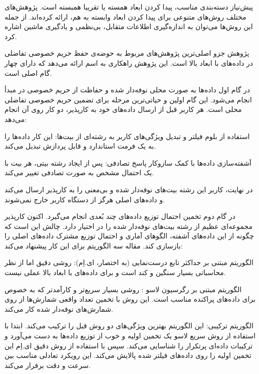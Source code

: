 پیش‌نیاز دسته‌بندی مناسب، پیدا کردن ابعاد همسته یا تقریبا همبسته است. پژوهش‌های مختلف روش‌های متنوعی برای پیدا کردن ابعاد وابسته به هم، ارائه کرده‌اند. از جمله این روش‌ها می‌توان به اندازه‌گیری اطلاعات متقابل، بی‌نظمی و یادگیری ماشین اشاره کرد.


پژوهش  جزو اصلی‌ترین پژوهش‌های مربوط به حوضه‌ی حفظ حریم خصوصی تفاضلی در داده‌های با ابعاد بالا است. این پژوهش راهکاری به اسم  ارائه می‌دهد که دارای چهار گام اصلی است.

در گام اول داده‌ها به صورت محلی نوفه‌دار شده و حفاظت از حریم خصوصی در مبدأ انجام می‌شود. این گام اولین و حیاتی‌ترین مرحله برای تضمین حریم خصوصی تفاضلی محلی است. هر کاربر قبل از ارسال داده‌های خود به کارپذیر، دو کار روی آن انجام می‌دهد:


 استفاده از بلوم فیلتر و تبدیل ویژگی‌های کاربر به رشته‌ای از بیت‌ها: این کار داده‌ها را به یک فرمت استاندارد و قابل پردازش تبدیل می‌کند.

 آشفته‌سازی داده‌ها با کمک سازوکار پاسخ تصادفی: پس از ایجاد رشته بیتی، هر بیت با یک احتمال مشخص به صورت تصادفی تغییر می‌کند.


در نهایت، کاربر این رشته بیت‌های نوفه‌دار شده و بی‌معنی را به کارپذیر ارسال می‌کند و داده‌های اصلی هرگز از دستگاه کاربر خارج نمی‌شوند.

در گام دوم تخمین احتمال توزیع داده‌های چند بُعدی انجام می‌گیرد. اکنون کارپذیر مجموعه‌ای عظیم از رشته بیت‌های نوفه‌دار شده را در اختیار دارد. چالش این است که چگونه از این داده‌های آشفته، الگوهای آماری و احتمال توزیع مشترک داده‌های اصلی را بازسازی کند. مقاله سه الگوریتم برای این کار پیشنهاد می‌کند:


 الگوریتم مبتنی بر حداکثر تابع درست‌نمایی (به اختصار، ای.اِم): روشی دقیق اما از نظر محاسباتی بسیار سنگین و کند است و برای داده‌های با ابعاد بالا عملی نیست.

 الگوریتم مبتنی بر رگرسیون لاسو : روشی بسیار سریع‌تر و کارآمدتر که به خصوص برای داده‌های پراکنده مناسب است. این روش با تخمین تعداد واقعی شمارش‌ها از روی شمارش‌های نوفه‌دار شده کار می‌کند.

 الگوریتم ترکیبی: این الگوریتم بهترین ویژگی‌های دو روش قبل را ترکیب می‌کند. ابتدا با استفاده از روش سریع لاسو یک تخمین اولیه و خوب از توزیع داده‌ها به دست می‌آورد و ترکیبات داده‌ای پرتکرار را شناسایی می‌کند. سپس با استفاده از روش دقیق ای.اِم این تخمین اولیه را روی داده‌های فیلتر شده پالایش می‌کند. این رویکرد تعادلی مناسب بین سرعت و دقت برقرار می‌کند.

